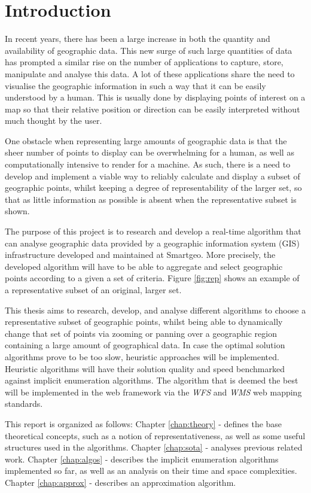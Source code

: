 \chapter{Introduction}
\label{chap:intro}

In recent years, there has been a large increase in both the quantity and availability of geographic data. This new surge of such large quantities of data has prompted a similar rise on the number of applications to capture, store, manipulate and analyse this data.
A lot of these applications share the need to visualise the geographic information in such a way that it can be easily understood by a human.
This is usually done by displaying points of interest on a map so that their relative position or direction can be easily interpreted without much thought by the user.

One obstacle when representing large amounts of geographic data is that the sheer number of points to display can be overwhelming for a human, as well as computationally intensive to render for a machine. As such, there is a need to develop and implement a viable way to reliably calculate and display a subset of geographic points, whilst keeping a degree of representability of the larger set, so that as little information as possible is absent when the representative subset is shown.

The purpose of this project is to research and develop a real-time algorithm that can analyse geographic data provided by a geographic information system (GIS) infrastructure developed and maintained at Smartgeo. More precisely, the developed algorithm will have to be able to aggregate and select geographic points according to a given a set of criteria. Figure \ref{fig:rep} shows an example of a representative subset of an original, larger set.


This thesis aims to research, develop, and analyse different algorithms to choose a representative subset of geographic points, whilst being able to dynamically change that set of points via zooming or panning over a geographic region containing a large amount of geographical data. In case the optimal solution algorithms prove to be too slow, heuristic approaches will be implemented. Heuristic algorithms will have their solution quality and speed benchmarked against implicit enumeration algorithms.
The algorithm that is deemed the best will be implemented in the web framework via the \emph{WFS} and \emph{WMS} web mapping standards.

This report is organized as follows:
Chapter \ref{chap:theory} -  defines the base theoretical concepts, such as a notion of representativeness, as well as some useful structures used in the algorithms. Chapter \ref{chap:sota} -  analyses previous related work. Chapter \ref{chap:algos} -  describes the implicit enumeration algorithms implemented so far, as well as an analysis on their time and space complexities. Chapter \ref{chap:approx} -  describes an approximation algorithm. 